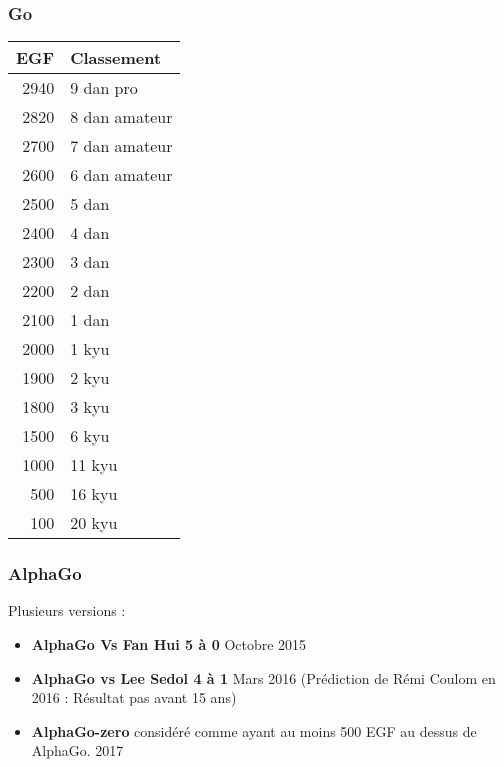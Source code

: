 \documentclass{formation}
\begin{document}
\begin{frame}
  \frametitle{Go}
  \begin{minipage}[c]{0.7\linewidth}
  \end{minipage}\hfill
  \begin{minipage}[c]{0.26\linewidth}
    \begin{adjustbox}{scale=0.8}
      \begin{tabular}{| r | l |}
        \hline
        EGF & Classement \\ \hline
        2940 & 9 dan pro \\ \hline
        2820 & 8 dan amateur \\ \hline
        2700 & 7 dan amateur \\ \hline
        2600 & 6 dan amateur \\ \hline
        2500 & 5 dan \\ \hline
        2400 & 4 dan \\ \hline
        2300 & 3 dan \\ \hline
        2200 & 2 dan \\ \hline
        2100 & 1 dan \\ \hline
        2000 & 1 kyu \\ \hline
        1900 & 2 kyu \\ \hline
        1800 & 3 kyu \\ \hline
        1500 & 6 kyu \\ \hline
        1000 & 11 kyu \\ \hline
        500 & 16 kyu \\ \hline
        100 & 20 kyu \\ \hline
      \end{tabular}
    \end{adjustbox}
  \end{minipage}\hfill
\end{frame}

\begin{frame}
  \frametitle{AlphaGo}
  Plusieurs versions :
  \begin{itemize}
  \item \textbf{AlphaGo Vs Fan Hui 5 à 0} Octobre 2015
  \item \textbf{AlphaGo vs Lee Sedol 4 à 1} Mars 2016 (Prédiction de Rémi Coulom en 2016 : Résultat pas avant 15 ans)
  \item \textbf{AlphaGo-zero} considéré comme ayant au moins 500 EGF au dessus de AlphaGo. 2017
  \end{itemize}
\end{frame}
\end{document}
